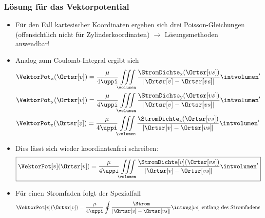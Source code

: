 \begin{frame}
  \frametitle{Lösung für das Vektorpotential}
  \begin{itemize}[<+->]
  \item Für den Fall \alert{kartesischer Koordinaten} ergeben sich drei Poisson-Gleichungen (offensichtlich nicht für Zylinderkoordinaten) $\to$ \alert{Lösungsmethoden anwendbar!}
    \item Analog zum Coulomb-Integral ergibt sich
\begin{align*}
	& \VektorPot_\mathrm{x}(\Ortsr[v]) = \dfrac{\mu}{4 \uppi} \iiint\limits_{\volumen} \dfrac{\StromDichte_\mathrm{x}(\Ortsr[vs]) }{\left| \Ortsr[v] - \Ortsr[vs] \right|} \intvolumen' \\
	& \VektorPot_\mathrm{y}(\Ortsr[v]) = \dfrac{\mu}{4 \uppi} \iiint\limits_{\volumen} \dfrac{\StromDichte_\mathrm{y}(\Ortsr[vs]) }{\left| \Ortsr[v] - \Ortsr[vs] \right|} \intvolumen' \\
	& \VektorPot_\mathrm{z}(\Ortsr[v]) = \dfrac{\mu}{4 \uppi} \iiint\limits_{\volumen} \dfrac{\StromDichte_\mathrm{z}(\Ortsr[vs]) }{\left| \Ortsr[v] - \Ortsr[vs] \right|} \intvolumen'
\end{align*}
\item Dies lässt sich wieder \alert{koordinatenfrei} schreiben:
\begin{equation*}
	\boxed{\VektorPot[v](\Ortsr[v]) = \dfrac{\mu}{4 \uppi} \iiint\limits_{\volumen} \dfrac{\StromDichte[v](\Ortsr[vs])}{\left| \Ortsr[v] - \Ortsr[vs] \right|} \intvolumen'} 
\end{equation*}
\item Für einen \alert{Stromfaden} folgt der Spezialfall
\begin{equation*}
	\VektorPot[v](\Ortsr[v]) = \dfrac{\mu}{4 \uppi} \oint \dfrac{\Strom}{\left| \Ortsr[v] - \Ortsr[vs] \right|} \intweg[vs] \text{ entlang des Stromfadens} 
      \end{equation*}
  \end{itemize}
\end{frame}

